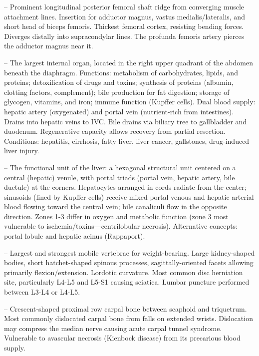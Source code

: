 -- Prominent longitudinal posterior femoral shaft ridge from converging muscle attachment lines. Insertion for adductor magnus, vastus medialis/lateralis, and short head of biceps femoris. Thickest femoral cortex, resisting bending forces. Diverges distally into supracondylar lines. The profunda femoris artery pierces the adductor magnus near it.

-- The largest internal organ, located in the right upper quadrant of the abdomen beneath the diaphragm. Functions: metabolism of carbohydrates, lipids, and proteins; detoxification of drugs and toxins; synthesis of proteins (albumin, clotting factors, complement); bile production for fat digestion; storage of glycogen, vitamins, and iron; immune function (Kupffer cells). Dual blood supply: hepatic artery (oxygenated) and portal vein (nutrient-rich from intestines). Drains into hepatic veins to IVC. Bile drains via biliary tree to gallbladder and duodenum. Regenerative capacity allows recovery from partial resection. Conditions: hepatitis, cirrhosis, fatty liver, liver cancer, gallstones, drug-induced liver injury.

-- The functional unit of the liver: a hexagonal structural unit centered on a central (hepatic) venule, with portal triads (portal vein, hepatic artery, bile ductule) at the corners. Hepatocytes arranged in cords radiate from the center; sinusoids (lined by Kupffer cells) receive mixed portal venous and hepatic arterial blood flowing toward the central vein; bile canaliculi flow in the opposite direction. Zones 1-3 differ in oxygen and metabolic function (zone 3 most vulnerable to ischemia/toxins—centrilobular necrosis). Alternative concepts: portal lobule and hepatic acinus (Rappaport).

-- Largest and strongest mobile vertebrae for weight-bearing. Large kidney-shaped bodies, short hatchet-shaped spinous processes, sagittally-oriented facets allowing primarily flexion/extension. Lordotic curvature. Most common disc herniation site, particularly L4-L5 and L5-S1 causing sciatica. Lumbar puncture performed between L3-L4 or L4-L5.

-- Crescent-shaped proximal row carpal bone between scaphoid and triquetrum. Most commonly dislocated carpal bone from falls on extended wrists. Dislocation may compress the median nerve causing acute carpal tunnel syndrome. Vulnerable to avascular necrosis (Kienbock disease) from its precarious blood supply.

